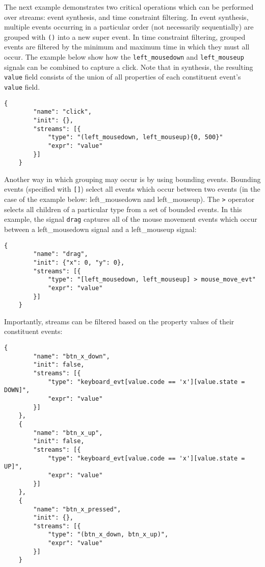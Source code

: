 \documentclass{article}
\begin{document}
The next example demonstrates two critical operations which can be performed over streams: event synthesis, and time constraint filtering.
In event synthesis, multiple events occurring in a particular order (not necessarily sequentially) are grouped with \texttt{()} into a new super event. In time constraint filtering, grouped events are filtered by the minimum and maximum time in which they must all occur. The example below show how the \texttt{left\_mousedown} and \texttt{left\_mouseup} signals can be combined to capture a click. Note that in synthesis, the resulting \texttt{value} field consists of the union of all properties of each constituent event's \texttt{value} field.

\begin{Verbatim}[baselinestretch=1.0]
    {
        "name": "click",
        "init": {},
        "streams": [{
            "type": "(left_mousedown, left_mouseup){0, 500}"
            "expr": "value"
        }]
    }
\end{Verbatim}

Another way in which grouping may occur is by using bounding events.
Bounding events (specified with \texttt{[]}) select all events which occur between two events (in the case of the example below: left\_mousedown and left\_mouseup). The \texttt{>} operator selects all children of a particular type from a set of bounded events. In this example, the signal \texttt{drag} captures all of the mouse movement events which occur between a left\_mousedown signal and a left\_mouseup signal:

\begin{Verbatim}[baselinestretch=1.0]
    {
        "name": "drag",
        "init": {"x": 0, "y": 0},
        "streams": [{
            "type": "[left_mousedown, left_mouseup] > mouse_move_evt"
            "expr": "value"
        }]
    }
\end{Verbatim}

Importantly, streams can be filtered based on the property values of their constituent events:

\begin{Verbatim}[baselinestretch=1.0]
    {
        "name": "btn_x_down",
        "init": false,
        "streams": [{ 
            "type": "keyboard_evt[value.code == 'x'][value.state = DOWN]",
            "expr": "value"
        }]
    },
    {
        "name": "btn_x_up",
        "init": false,
        "streams": [{ 
            "type": "keyboard_evt[value.code == 'x'][value.state = UP]",
            "expr": "value"
        }]
    },
    {
        "name": "btn_x_pressed",
        "init": {},
        "streams": [{ 
            "type": "(btn_x_down, btn_x_up)",
            "expr": "value"
        }]
    }
\end{Verbatim}
\end{document}
